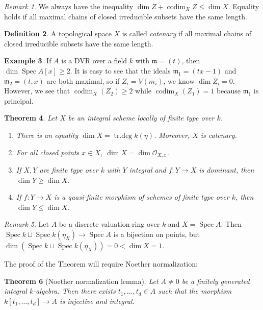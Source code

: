 \documentclass[leqno, openany]{memoir}
\newtheorem{thm}{Theorem}[section]
\theoremstyle{definition}
\newtheorem{defn}[thm]{Definition}
\newtheorem{exm}[thm]{Example}
\theoremstyle{remark}
\newtheorem{rmk}[thm]{Remark}
\theoremstyle{plain}
\theoremstyle{definition}
\theoremstyle{remark}
\newcommand{\mf}[1]{\mathfrak{#1}}
\newcommand{\msc}[1]{\mathscr{#1}}
\DeclareMathOperator{\Spec}{Spec}
\DeclareMathOperator{\codim}{codim}
\begin{document}
\begin{rmk}
    We always have the inequality $\dim Z + \codim_X Z \leq \dim X$. Equality holds if all maximal chains of closed irreducible subsets have the same length.
\end{rmk}

\begin{defn}
    A topological space $X$ is called \textit{catenary} if all maximal chains of closed irreducible subsets have the same length. 
\end{defn}

\begin{exm}
    If $A$ is a DVR over a field $k$ with $\mf{m} = (t)$, then $\dim \Spec A[x] \geq 2$. It is easy to see that the ideals $\mf{m}_1 = (tx-1)$ and $\mf{m}_2 = (t,x)$ are both maximal, so if $Z_i = V(m_i)$, we know $\dim Z_i = 0$. However, we see that $\codim_X(Z_2) \geq 2$ while $\codim_X (Z_1) = 1$ because $\mf{m}_1$ is principal.
\end{exm}

\begin{thm}\label{thm:dimfinitetype}
    Let $X$ be an integral scheme locally of finite type over $k$.
    \begin{enumerate}
        \item There is an equality $\dim X = \operatorname{tr.deg} k(\eta)$. Moreover, $X$ is catenary.
        \item For all closed points $x \in X$, $\dim X = \dim \msc{O}_{X,x}$.
        \item If $X, Y$ are finite type over $k$ with $Y$ integral and $f \colon Y \to X$ is dominant, then $\dim Y \geq \dim X$.
        \item If $f \colon Y \to X$ is a quasi-finite morphism of schemes of finite type over $k$, then $\dim Y \leq \dim X$.
    \end{enumerate}
\end{thm}

\begin{rmk}
    Let $A$ be a discrete valuation ring over $k$ and $X = \Spec A$. Then $\Spec k \sqcup \Spec k(\eta_X) \to \Spec A$ is a bijection on points, but $\dim (\Spec k \sqcup \Spec k(\eta_X)) = 0 < \dim X = 1$.
\end{rmk}

The proof of the Theorem will require Noether normalization:
\begin{thm}[Noether normalization lemma]
    Let $A \neq 0$ be a finitely generated integral $k$-algebra. Then there exists $t_1, \ldots, t_d \in A$ such that the morphism $k[t_1, \ldots, t_d] \to A$ is injective and integral.
\end{thm}
\end{document}

